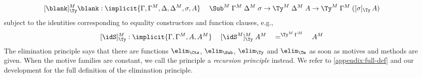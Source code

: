\documentclass[a4paper,UKenglish,numberwithinsect,cleveref,thm-restate]{lipics-v2021}
\begin{document}
\begin{alignat*}{3}
  [\blank]_{\Ty}^M\blank & : \implicit{\Gamma, \Gamma^M,\Delta, \Delta^M, \sigma, A} \; && \Sub^M\;\Gamma^M\;\Delta^M\;\sigma \to \Ty^M\;\Delta^M\;A \to \Ty^M\;\Gamma^M\;([\sigma]_{\Ty}\,A) %
\end{alignat*}
subject to the identities corresponding to equality constructors and function clauses, e.g.,
\begin{alignat*}{5}
  [\idS]_{\Ty}^M & : \implicit{\Gamma, \Gamma^M, A, A^M}\; && [ \idS^M ]^M_{\Ty} \;A^M && =^{\Ty^M\,\Gamma^M}\;&& A^M %
\end{alignat*}
%
The elimination principle says that there are functions $\elim_{\Ctx}$, $\elim_{\Sub}$, $\elim_{\Ty}$ and $\elim_{\Tm}$ as soon as motives and methods are given.
When the motive families are constant, we call the principle a \emph{recursion principle} instead.
We refer to \cref{appendix:full-def} and our \Agda development for the full definition of the elimination principle.
%
%
\end{document}
